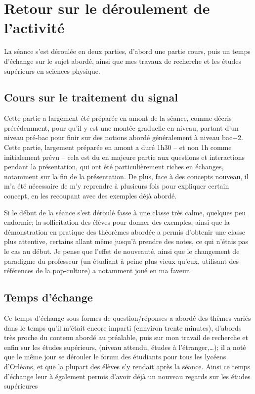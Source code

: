 \documentclass[12pt]{article}
\begin{document}
\section{Retour sur le déroulement de l'activité}

La séance s'est déroulée en deux parties, d'abord une partie cours, puis un temps d'échange sur le sujet abordé, ainsi que mes travaux de recherche et les études supérieurs en sciences physique.
\subsection{Cours sur le traitement du signal}


Cette partie a largement été préparée en amont de la séance, comme décris précédemment, pour qu'il y est une montée graduelle en niveau, partant d'un niveau pré-bac pour finir sur des notions abordé généralement à niveau bac+2.
Cette partie, largement préparée en amont a duré 1h30 -- et non 1h comme initialement prévu -- cela est du en majeure partie aux questions et interactions pendant la présentation, qui ont été particulièrement riches en échanges, notamment sur la fin de la présentation. De plus, face à des concepts nouveau, il m'a été nécessaire de m'y reprendre à plusieurs fois pour expliquer certain concept, en les recoupant avec des exemples déjà abordé.
   
Si le début de la séance s'est déroulé fasse à une classe très calme,  quelques peu endormie; la sollicitation des élèves pour donner des exemples, ainsi que la démonstration en pratique des théorèmes abordée a permis d'obtenir une classe plus attentive, certains allant même jusqu'à prendre des notes, ce qui n'étais pas le cas au début. Je pense que l'effet de nouveauté, ainsi que le changement de paradigme du professeur (un étudiant à peine plus vieux qu'eux, utilisant des références de la pop-culture) a notamment joué en ma faveur.

\subsection{Temps d'échange}

 Ce temps d'échange sous formes de question/réponses a abordé des thèmes variés dans le temps qu'il m'était encore imparti (ennviron trente minutes), d'abords très proche du contenu abordé au préalable, puis sur mon travail de recherche et enfin sur les études supérieurs, (niveau attendu, études à l'étranger,\ldots); il a noté que le même jour se dérouler le forum des étudiants pour tous les lycéens d'Orléans, et que la plupart des élèves s'y rendait après la séance. Ainsi ce temps d'échange leur à également permis d'avoir déjà un nouveau regards sur les études supérieures
\end{document}
